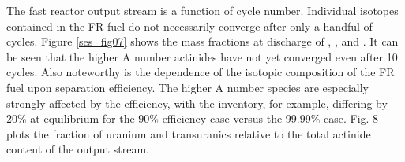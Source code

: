 The fast reactor output stream is a function of cycle number. 
Individual isotopes contained in the FR fuel do not necessarily converge
after only a handful of cycles.  Figure \ref{ses_fig07} shows the mass fractions at
discharge of , ,  and .  
It can be seen that the higher A number actinides have not yet converged even after 10 cycles. 
Also noteworthy is the dependence of the isotopic composition of the FR
fuel upon separation efficiency.  The higher A number species are
especially strongly affected by the efficiency, with the 
inventory, for example, differing by 20\% at equilibrium for the 90\%
efficiency case versus the 99.99\% case.  Fig. 8 plots the fraction of
uranium and transuranics relative to the total actinide content of the
output stream.


